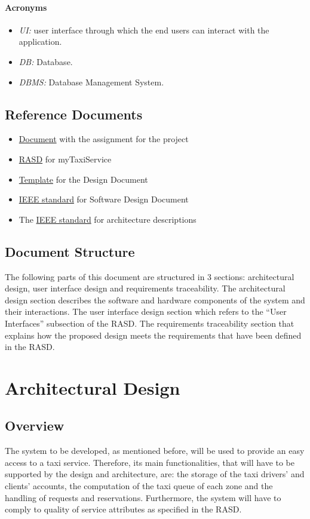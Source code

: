 \documentclass{article}
\begin{document}
\paragraph{Acronyms}
\begin{itemize}
	\item \textit{UI:} user interface through which the end users can interact with the application.
	\item \textit{DB:} Database.
	\item \textit{DBMS:} Database Management System.
\end{itemize}
\subsection{Reference Documents}
\begin{itemize}
	\item \href{run:./external_references/assignments.pdf}{Document} with the assignment for the project
	\item \href{run:./external_references/Rasd.pdf}{RASD} for myTaxiService
	\item \href{run:./external_references/DDTOC.pdf}{Template} for the Design Document
	\item \href{run:./external_references/IEEESoftwareDesignDescriptions.pdf}{IEEE standard} for Software Design Document
	\item The \href{run:./external_references/IEEEArchitectureDescription.pdf}{IEEE standard} for architecture descriptions
\end{itemize}
\subsection{Document Structure}
The following parts of this document are structured in 3 sections: architectural design, user interface design and requirements traceability. The architectural design section describes the software and hardware components of the system and their interactions. The user interface design section which refers to the ``User Interfaces'' subsection of the RASD\@. The requirements traceability section that explains how the proposed design meets the requirements that have been defined in the RASD\@.
\clearpage
\section{Architectural Design}
\subsection{Overview}
The system to be developed, as mentioned before, will be used to provide an easy access to a taxi service. Therefore, its main functionalities, that will have to be supported by the design and architecture, are: the storage of the taxi drivers' and clients' accounts, the computation of the taxi queue of each zone and the handling of requests and reservations. Furthermore, the system will have to comply to quality of service attributes as specified in the RASD\@.
\end{document}
